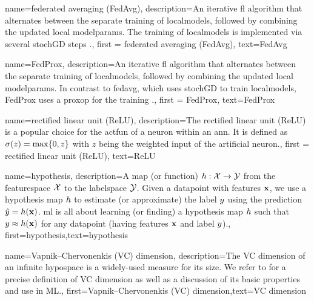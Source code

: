 {name={federated averaging (FedAvg)},
	description={An iterative \gls{fl} 
		algorithm that alternates between the separate training of \gls{localmodel}s, followed by 
		combining the updated local \gls{modelparams}. The training of \gls{localmodel}s 
		is implemented via several \gls{stochGD} steps \cite{pmlr-v54-mcmahan17a}.}, 
		first = {federated averaging (FedAvg)}, text={FedAvg} 
}

{name={FedProx},
	description={An iterative \gls{fl} 
		algorithm that alternates between the separate training of \gls{localmodel}s, followed by 
		combining the updated local \gls{modelparams}. In contrast to \gls{fedavg}, which uses 
		\gls{stochGD} to train \gls{localmodel}s, FedProx uses a \gls{proxop} for the training \cite{FedProx2020}.}, 
	first = {FedProx}, text={FedProx} 
}

{name={rectified linear unit (ReLU)},
	description={The rectified linear unit (ReLU) is 
		a popular choice for the \gls{actfun} of a neuron within an \gls{ann}. It is defined 
		as $\sigma(z) = \max\{0,z\}$ with $z$ being the weighted input of the artificial 
		neuron.}, first = {rectified linear unit (ReLU)}, text={ReLU} 
}

{name={hypothesis},
	description={A map (or function) $h: \mathcal{X} \rightarrow \mathcal{Y}$ from the 
		\gls{featurespace} $\mathcal{X}$ to the \gls{labelspace} $\mathcal{Y}$. 
		Given a \gls{datapoint} with \gls{feature}s ${\bf x}$, we use a hypothesis map $h$
		to estimate (or approximate) the \gls{label} $y$ using the \gls{prediction}  
		$\hat{y} = h({\bf x})$. \Gls{ml} is all about learning (or finding) a 
		hypothesis map $h$ such that $y \approx h({\bf x})$ 
		for any \gls{datapoint} (having \gls{feature}s ${\bf x}$ and \gls{label} $y$).},
	first={hypothesis},text={hypothesis}  
}



{name={Vapnik–Chervonenkis (VC) dimension},
	description={The VC dimension of an infinite \gls{hypospace} is a widely-used measure 
		for its size. We refer to \cite{ShalevMLBook} for a precise definition of VC dimension 
		as well as a discussion of its basic properties and use in ML.},
	first={Vapnik–Chervonenkis (VC) dimension},text={VC dimension}  
}

